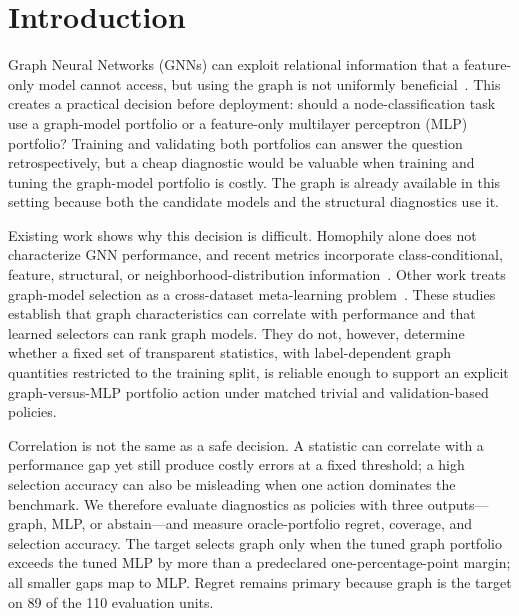 
\section{Introduction}
\label{sec:intro}

Graph Neural Networks (GNNs) can exploit relational information that a feature-only model cannot access, but using the graph is not uniformly beneficial~\cite{kipf2017gcn,velivckovic2018gat,hamilton2017graphsage}. This creates a practical decision before deployment: should a node-classification task use a graph-model portfolio or a feature-only multilayer perceptron (MLP) portfolio? Training and validating both portfolios can answer the question retrospectively, but a cheap diagnostic would be valuable when training and tuning the graph-model portfolio is costly. The graph is already available in this setting because both the candidate models and the structural diagnostics use it.

Existing work shows why this decision is difficult. Homophily alone does not characterize GNN performance, and recent metrics incorporate class-conditional, feature, structural, or neighborhood-distribution information~\cite{luan2023whendo,platonov2023characterizing,zheng2024trihom,pmlr-v235-wang24u}. Other work treats graph-model selection as a cross-dataset meta-learning problem~\cite{park2023metagl,park2023glemos}. These studies establish that graph characteristics can correlate with performance and that learned selectors can rank graph models. They do not, however, determine whether a fixed set of transparent statistics, with label-dependent graph quantities restricted to the training split, is reliable enough to support an explicit graph-versus-MLP portfolio action under matched trivial and validation-based policies.

Correlation is not the same as a safe decision. A statistic can correlate with a performance gap yet still produce costly errors at a fixed threshold; a high selection accuracy can also be misleading when one action dominates the benchmark. We therefore evaluate diagnostics as policies with three outputs---graph, MLP, or abstain---and measure oracle-portfolio regret, coverage, and selection accuracy. The target selects graph only when the tuned graph portfolio exceeds the tuned MLP by more than a predeclared one-percentage-point margin; all smaller gaps map to MLP. Regret remains primary because graph is the target on 89 of the 110 evaluation units.

